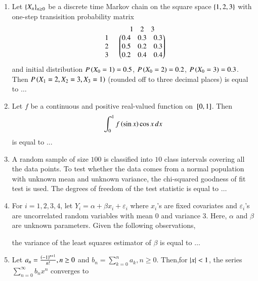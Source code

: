 \documentclass[journal,12pt,onecolumn]{IEEEtran}
\theoremstyle{remark}
\begin{document}
\begin{enumerate}
\item Let $\left\{X_n\right\}_{n\geq 0}$ be a discrete time Markov chain on the square space $\left\{1,2,3\right\}$ with one-step transisition probability matrix
   \begin{align}
\begin{array}{c c}
    & \begin{array}{ccc}
        1 & 2 & 3 \\
    \end{array} \\ 
    \begin{array}{c}
        1 \\ 
        2 \\ 
        3 \\ 
    \end{array} & 
    \begin{pmatrix}
        0.4 & 0.3 & 0.3 \\ 
        0.5 & 0.2 & 0.3 \\ 
        0.2 & 0.4 & 0.4 \\ 
    \end{pmatrix}
\end{array}
\end{align}
and initial distribution $P\left(X_0 = 1\right) = 0.5$, $P\left(X_0 = 2\right) = 0.2$, $P\left(X_0 = 3\right) = 0.3$. Then $P\left(X_1 = 2, X_2 = 3, X_3 = 1\right)$ (rounded off to three decimal places) is equal to $\dots$
\item Let $f$ be a continuous and positive real-valued function on ${}\left[0, 1\right]$. Then
\begin{align}
\int^1_0 f\left(\sin x\right) \cos x \, dx
\end{align}
is equal to ...
\item A random sample of size $100$ is classified into $10$ class intervals covering all the data points. To test whether the data comes from a normal population with unknown mean and unknown variance, the chi-squared goodness of fit test is used. The degrees of freedom of the test statistic is equal to $\dots$
\item For $i = 1, 2, 3, 4$, let $Y_i = \alpha + \beta x_i + \varepsilon_i$ where $x_i$'s are fixed covariates and $\varepsilon_i$'s are uncorrelated random variables with mean 0 and variance 3. Here, $\alpha$ and $\beta$ are unknown parameters. Given the following observations,
\begin{table}[h!]    
  \centering
  
\end{table}
the variance of the least squares estimator of $\beta$ is equal to $\dots$
\item Let $a_n = \frac{\left(-1\right)^{n+1}}{n!} , n \geq 0$ and $b_n = \sum_{k=0}^n a_k , n \geq 0$. Then,for $\left\vert x\right\vert<1$, the series $\sum_{n=0}^{\infty} b_n x^n$ converges to

\end{enumerate}
\end{document}

